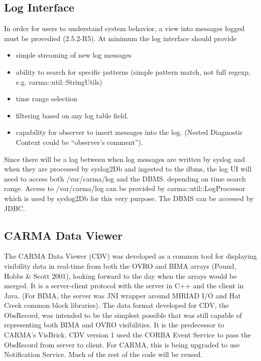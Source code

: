 \documentclass[preprint]{aastex}
\begin{document}
\subsection{Log Interface}

In order for users to understand system behavior,
a view into messages logged must be provedied (2.5.2-R5). 
At minimum the log interface should provide 
\begin{itemize}
\item simple streaming of new log messages 
\item ability to search for specific patterns (simple pattern match, 
  not full regexp, e.g. carma::util::StringUtils)
\item time range selection 
\item filtering based on any log table field.
\item capability for observer to insert messages into the log.
(Nested Diagnostic Context could be ``observer's comment'').
\end{itemize}

Since there will be a lag between when log messages are written by syslog
and when they are processed by syslog2Db and ingested to the
dbms, the log UI will need to access both /var/carma/log and the DBMS.
depending on time search range.  Access to /var/carma/log can be
provided by carma::util::LogProcessor which is used by syslog2Db for
this very purpose.  The DBMS can be accessed by JDBC.

\subsection{CARMA Data Viewer}

The CARMA Data Viewer (CDV) was developed as a common tool for displaying
visibility data in real-time from both the OVRO and BIMA arrays (Pound,
Hobbs \& Scott 2001), looking forward to the day when the arrays would
be merged.  It is a server-client protocol with the server in C++ and the
client in Java.  (For BIMA, the server was JNI wrapper
around MIRIAD I/O and Hat Creek common block libraries).  The data format
developed for CDV, the ObsRecord,  was intended to be the simplest possible
that was still capable of representing both BIMA and OVRO visibilities. It
is the predecessor to CARMA's VisBrick.  CDV version 1 used the CORBA
Event Service to pass the ObsRecord from server to client.  For CARMA,
this is being upgraded to use Notification Service.  Much of the rest
of the code will be reused.  
\end{document}
